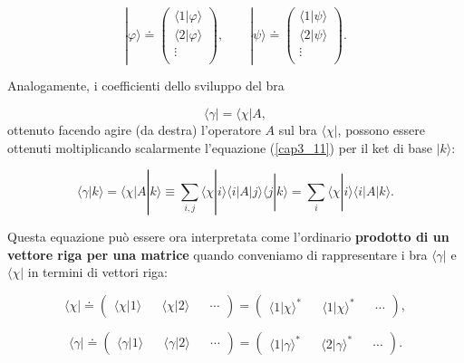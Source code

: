 \begin{equation}
| \varphi \rangle \doteq 
\begin{pmatrix}
\langle 1 | \varphi \rangle \\
\langle 2 | \varphi \rangle \\
\vdots \\
\end{pmatrix}, \qquad
| \psi \rangle \doteq 
\begin{pmatrix}
\langle 1 | \psi \rangle \\
\langle 2 | \psi \rangle \\
\vdots \\
\end{pmatrix} .
\end{equation}

Analogamente, i coefficienti dello sviluppo del bra

\begin{equation}
\langle \gamma | = \langle \chi | A ,
\end{equation}
ottenuto facendo agire (da destra) l'operatore $A$ sul bra $\langle \chi | $, possono essere ottenuti moltiplicando scalarmente l'equazione (\ref{cap3_11}) per il ket di base $| k \rangle$:

\begin{equation}
\langle \gamma | k \rangle = \langle \chi | A | k \rangle \equiv \sum \limits_{i,j}  \langle \chi | i \rangle \langle i | A | j \rangle  \langle j | k \rangle = \sum \limits_{i} \langle \chi | i \rangle  \langle i | A | k \rangle .
\end{equation}

Questa equazione può essere ora interpretata come l'ordinario \textbf{prodotto di un vettore riga per una matrice} quando conveniamo di rappresentare i bra $ \langle \gamma |$ e  $\langle \chi |$ in termini di vettori riga:

\begin{equation}
\langle \chi | \doteq 
\begin{pmatrix}
\langle \chi | 1 \rangle && \langle \chi | 2 \rangle && \cdots 
\end{pmatrix}
 = 
\begin{pmatrix}
\langle 1 | \chi \rangle ^* && \langle 1 | \chi \rangle ^* && \cdots
\end{pmatrix} ,
\end{equation}

\begin{equation}
\langle \gamma | \doteq 
\begin{pmatrix}
\langle \gamma | 1 \rangle && \langle \gamma | 2 \rangle && \cdots 
\end{pmatrix}
 = 
\begin{pmatrix}
\langle 1 | \gamma \rangle ^* && \langle 2 | \gamma \rangle ^* && \cdots
\end{pmatrix} .
\end{equation}

